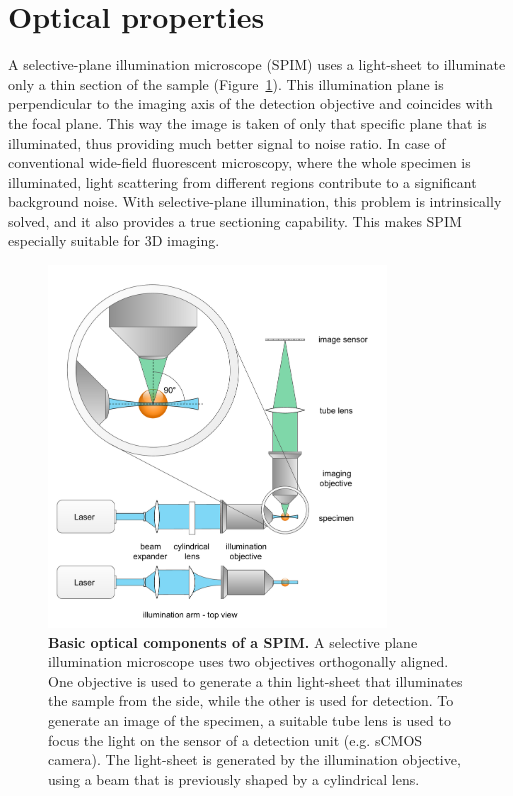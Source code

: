 \documentclass{diploma_style}
\begin{document}
\section{Optical properties}

A selective-plane illumination microscope (SPIM) uses a light-sheet to illuminate only a thin section of the sample (Figure~\ref{fig:light-sheet}). This illumination plane is perpendicular to the imaging axis of the detection objective and coincides with the focal plane. This way the image is taken of only that specific plane that is illuminated, thus providing much better signal to noise ratio. In case of conventional wide-field fluorescent microscopy, where the whole specimen is illuminated, light scattering from different regions contribute to a significant background noise. With selective-plane illumination, this problem is intrinsically solved, and it also provides a true sectioning capability. This makes SPIM especially suitable for 3D imaging.



\begin{figure}[htpb]
	\centering
	\includegraphics[width=0.8\textwidth]{figures/2_spim/light-sheet}
	\caption{\textbf{Basic optical components of a SPIM.} A selective plane illumination microscope uses two objectives orthogonally aligned. One objective is used to generate a thin light-sheet that illuminates the sample from the side, while the other is used for detection. To generate an image of the specimen, a suitable tube lens is used to focus the light on the sensor of a detection unit (e.g. sCMOS camera). The light-sheet is generated by the illumination objective, using a beam that is previously shaped by a cylindrical lens.}
	\label{fig:light-sheet}
\end{figure}
\end{document}
